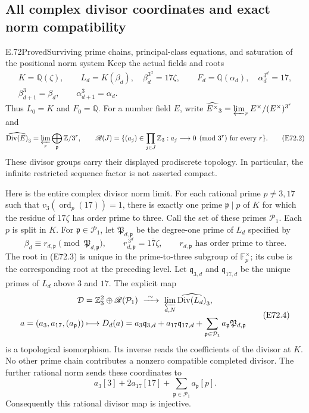 \subsection{All complex divisor coordinates and exact norm compatibility}

\begin{statement}{E.72}{Proved}{Surviving prime chains, principal-class equations, and saturation of the positional norm system}
Keep the actual fields and roots
\[
 \begin{gathered}
 K=\mathbb Q(\zeta),\qquad
 L_d=K(\beta_d),\quad \beta_d^{3^d}=17\zeta,\qquad
 F_d=\mathbb Q(\alpha_d),\quad \alpha_d^{3^d}=17,\\
 \beta_{d+1}^3=\beta_d,\qquad\alpha_{d+1}^3=\alpha_d .
 \end{gathered}
 \tag{E72.1}
\]
Thus $L_0=K$ and $F_0=\mathbb Q$. For a number field $E$,
write $\widehat{E^\times}_3=\varprojlim_r E^\times/(E^\times)^{3^r}$
and
\[
 \widehat{\operatorname{Div}(E)}_3
  =\varprojlim_r\bigoplus_{\mathfrak p}\mathbb Z/3^r,\qquad
 \mathscr R(J)=\{(a_j)\in\prod_{j\in J}\mathbb Z_3:
       a_j\longrightarrow0\pmod{3^r}\text{ for every }r\}.
 \tag{E72.2}
\]
These divisor groups carry their displayed prodiscrete topology.
In particular, the infinite restricted sequence factor is not
asserted compact.

Here is the entire complex divisor norm limit. For each rational
prime $p\ne3,17$ such that
$v_3(\operatorname{ord}_p(17))=1$, there is exactly one prime
$\mathfrak p\mid p$ of $K$ for which the residue of $17\zeta$
has order prime to three. Call the set of these primes $\mathcal P_1$.
Each $p$ is split in $K$. For $\mathfrak p\in\mathcal P_1$, let
$\mathfrak P_{d,\mathfrak p}$ be the degree-one prime of $L_d$
specified by
\[
 \beta_d\equiv r_{d,\mathfrak p}\pmod{\mathfrak P_{d,\mathfrak p}},
 \qquad
 r_{d,\mathfrak p}^{\,3^d}=\overline{17\zeta},
 \qquad r_{d,\mathfrak p}\text{ has order prime to three}.
 \tag{E72.3}
\]
The root in (E72.3) is unique in the prime-to-three subgroup of
$\mathbb F_p^\times$; its cube is the corresponding root at the
preceding level. Let $\mathfrak q_{3,d}$ and $\mathfrak q_{17,d}$
be the unique primes of $L_d$ above $3$ and $17$. The explicit map
\[
 \begin{split}
 \mathcal D&=\mathbb Z_3^2\oplus\mathscr R(\mathcal P_1)
       \ \xrightarrow{\ \sim\ }\
       \varprojlim_{d,N}\widehat{\operatorname{Div}(L_d)}_3,\\
 a=(a_3,a_{17},(a_{\mathfrak p}))
       &\longmapsto
 D_d(a)=a_3\mathfrak q_{3,d}
       +a_{17}\mathfrak q_{17,d}
       +\sum_{\mathfrak p\in\mathcal P_1}
                      a_{\mathfrak p}\mathfrak P_{d,\mathfrak p}
 \end{split}
 \tag{E72.4}
\]
is a topological isomorphism. Its inverse reads the coefficients
of the divisor at $K$. No other prime chain contributes a
nonzero compatible completed divisor. The further rational norm
sends these coordinates to
\[
 a_3[3]+2a_{17}[17]
       +\sum_{\mathfrak p\in\mathcal P_1}
                              a_{\mathfrak p}[p].
 \tag{E72.5}
\]
Consequently this rational divisor map is injective.


\end{statement}
